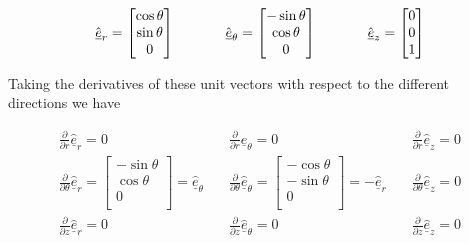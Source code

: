 \begin{equation*}
  \hat{\underline{e}}_{r}=
  \begin{bmatrix}
    \cos\theta \\
    \sin\theta \\
    0 \\
  \end{bmatrix}
  \hspace{0.5in}
  \hat{\underline{e}}_{\theta}=
  \begin{bmatrix}
    -\sin\theta \\
    \cos\theta \\
    0 \\
  \end{bmatrix}
  \hspace{0.5in}
  \hat{\underline{e}}_{z}=
  \begin{bmatrix}
    0 \\
    0 \\
    1 \\
  \end{bmatrix}
\end{equation*}

Taking the derivatives of these unit vectors with respect to the different directions we have

\begin{equation*}
  \begin{array}{ccc}
    \frac{\partial}{\partial{}r}\hat{\underline{e}}_{r}=0 & \quad
    \frac{\partial}{\partial{}r}\hat{\underline{e}}_{\theta}=0 & \quad
    \frac{\partial}{\partial{}r}\hat{\underline{e}}_{z}=0 \\[24pt]
    \frac{\partial}{\partial{}\theta}\hat{\underline{e}}_{r}=
  \begin{bmatrix}
    -\sin\theta \\
    \cos\theta \\
    0 \\
  \end{bmatrix}=\hat{\underline{e}}_{\theta} & \quad
  \frac{\partial}{\partial{}\theta}\hat{\underline{e}}_{\theta}=
  \begin{bmatrix}
    -\cos\theta \\
    -\sin\theta \\
    0 \\
  \end{bmatrix}=-\hat{\underline{e}}_{r} & \quad
    \frac{\partial}{\partial{}\theta}\hat{\underline{e}}_{z}=0 \\[24pt]
    \frac{\partial}{\partial{}z}\hat{\underline{e}}_{r}= 0 & \quad
    \frac{\partial}{\partial{}z}\hat{\underline{e}}_{\theta}=0 & \quad
    \frac{\partial}{\partial{}z}\hat{\underline{e}}_{z}=0
  \end{array}
\end{equation*}

